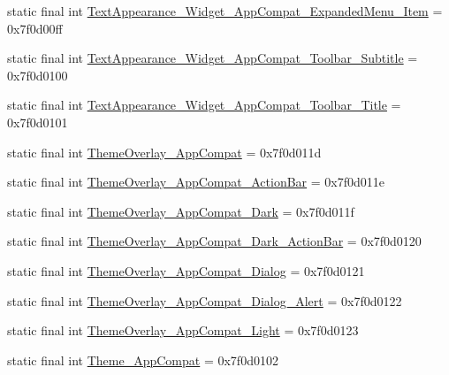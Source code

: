 \begin{DoxyCompactItemize}
static final int \mbox{\hyperlink{classandroid_1_1support_1_1v7_1_1appcompat_1_1_r_1_1style_af4b9716161695143ddd2776e7821bfd3}{Text\+Appearance\+\_\+\+Widget\+\_\+\+App\+Compat\+\_\+\+Expanded\+Menu\+\_\+\+Item}} = 0x7f0d00ff
\item 
static final int \mbox{\hyperlink{classandroid_1_1support_1_1v7_1_1appcompat_1_1_r_1_1style_ac0dfcde296d98d6934a405e562bcb03a}{Text\+Appearance\+\_\+\+Widget\+\_\+\+App\+Compat\+\_\+\+Toolbar\+\_\+\+Subtitle}} = 0x7f0d0100
\item 
static final int \mbox{\hyperlink{classandroid_1_1support_1_1v7_1_1appcompat_1_1_r_1_1style_a28d5448998ba455f9737b0c596c86e4c}{Text\+Appearance\+\_\+\+Widget\+\_\+\+App\+Compat\+\_\+\+Toolbar\+\_\+\+Title}} = 0x7f0d0101
\item 
static final int \mbox{\hyperlink{classandroid_1_1support_1_1v7_1_1appcompat_1_1_r_1_1style_a64b85d09de2998a010cefa99b11df028}{Theme\+Overlay\+\_\+\+App\+Compat}} = 0x7f0d011d
\item 
static final int \mbox{\hyperlink{classandroid_1_1support_1_1v7_1_1appcompat_1_1_r_1_1style_a082b745b4e2430ec34548fd43dabd3c6}{Theme\+Overlay\+\_\+\+App\+Compat\+\_\+\+Action\+Bar}} = 0x7f0d011e
\item 
static final int \mbox{\hyperlink{classandroid_1_1support_1_1v7_1_1appcompat_1_1_r_1_1style_a153bf2a32f53c4a761520ebb9d57ba46}{Theme\+Overlay\+\_\+\+App\+Compat\+\_\+\+Dark}} = 0x7f0d011f
\item 
static final int \mbox{\hyperlink{classandroid_1_1support_1_1v7_1_1appcompat_1_1_r_1_1style_a51b51d13caa660cffc430f496874d8dc}{Theme\+Overlay\+\_\+\+App\+Compat\+\_\+\+Dark\+\_\+\+Action\+Bar}} = 0x7f0d0120
\item 
static final int \mbox{\hyperlink{classandroid_1_1support_1_1v7_1_1appcompat_1_1_r_1_1style_aef17421b16165eacac83a3c957f994d0}{Theme\+Overlay\+\_\+\+App\+Compat\+\_\+\+Dialog}} = 0x7f0d0121
\item 
static final int \mbox{\hyperlink{classandroid_1_1support_1_1v7_1_1appcompat_1_1_r_1_1style_a9cc27c98642ced4bbf8c2324b8c3be33}{Theme\+Overlay\+\_\+\+App\+Compat\+\_\+\+Dialog\+\_\+\+Alert}} = 0x7f0d0122
\item 
static final int \mbox{\hyperlink{classandroid_1_1support_1_1v7_1_1appcompat_1_1_r_1_1style_a9aee71f01b9ed4c13fef15dcd60b2316}{Theme\+Overlay\+\_\+\+App\+Compat\+\_\+\+Light}} = 0x7f0d0123
\item 
static final int \mbox{\hyperlink{classandroid_1_1support_1_1v7_1_1appcompat_1_1_r_1_1style_a36039e9a627267e186a60d97337bdde1}{Theme\+\_\+\+App\+Compat}} = 0x7f0d0102

\end{DoxyCompactItemize}
